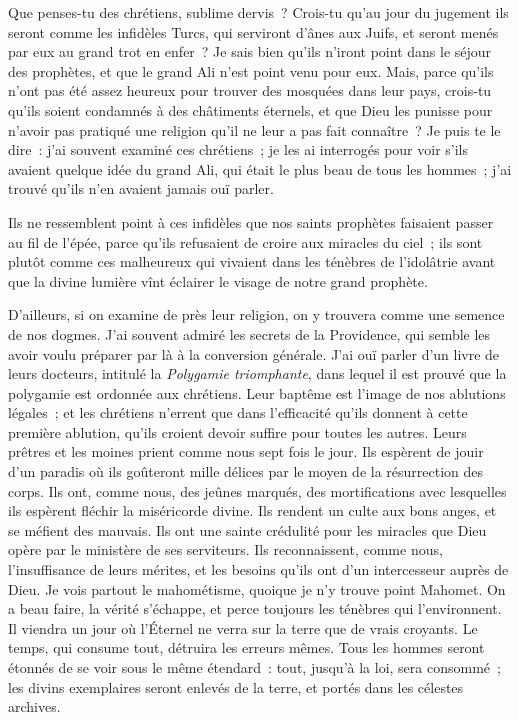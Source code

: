 \documentclass[french,twoside]{book} %
\begin{document}
\noindent Que penses-tu des chrétiens, sublime dervis ? Crois-tu qu’au jour du jugement ils seront comme les infidèles Turcs, qui serviront d’ânes aux Juifs, et seront menés par eux au grand trot en enfer ? Je sais bien qu’ils n’iront point dans le séjour des prophètes, et que le grand Ali n’est point venu pour eux. Mais, parce qu’ils n’ont pas été assez heureux pour trouver des mosquées dans leur pays, crois-tu qu’ils soient condamnés à des châtiments éternels, et que Dieu les punisse pour n’avoir pas pratiqué une religion qu’il ne leur a pas fait connaître ? Je puis te le dire : j’ai souvent examiné ces chrétiens ; je les ai interrogés pour voir s’ils avaient quelque idée du grand Ali, qui était le plus beau de tous les hommes ; j’ai trouvé qu’ils n’en avaient jamais ouï parler.\par
Ils ne ressemblent point à ces infidèles que nos saints prophètes faisaient passer au fil de l’épée, parce qu’ils refusaient de croire aux miracles du ciel ; ils sont plutôt comme ces malheureux qui vivaient dans les ténèbres de l’idolâtrie avant que la divine lumière vînt éclairer le visage de notre grand prophète.\par
D’ailleurs, si on examine de près leur religion, on y trouvera comme une semence de nos dogmes. J’ai souvent admiré les secrets de la Providence, qui semble les avoir voulu préparer par là à la conversion générale. J’ai ouï parler d’un livre de leurs docteurs, intitulé la {\itshape Polygamie triomphante}, dans lequel il est prouvé que la polygamie est ordonnée aux chrétiens. Leur baptême est l’image de nos ablutions légales ; et les chrétiens n’errent que dans l’efficacité qu’ils donnent à cette première ablution, qu’ils croient devoir suffire pour toutes les autres. Leurs prêtres et les moines prient comme nous sept fois le jour. Ils espèrent de jouir d’un paradis où ils goûteront mille délices par le moyen de la résurrection des corps. Ils ont, comme nous, des jeûnes marqués, des mortifications avec lesquelles ils espèrent fléchir la miséricorde divine. Ils rendent un culte aux bons anges, et se méfient des mauvais. Ils ont une sainte crédulité pour les miracles que Dieu opère par le ministère de ses serviteurs. Ils reconnaissent, comme nous, l’insuffisance de leurs mérites, et les besoins qu’ils ont d’un intercesseur auprès de Dieu. Je vois partout le mahométisme, quoique je n’y trouve point Mahomet. On a beau faire, la vérité s’échappe, et perce toujours les ténèbres qui l’environnent. Il viendra un jour où l’Éternel ne verra sur la terre que de vrais croyants. Le temps, qui consume tout, détruira les erreurs mêmes. Tous les hommes seront étonnés de se voir sous le même étendard : tout, jusqu’à la loi, sera consommé ; les divins exemplaires seront enlevés de la terre, et portés dans les célestes archives.\par
\end{document}
